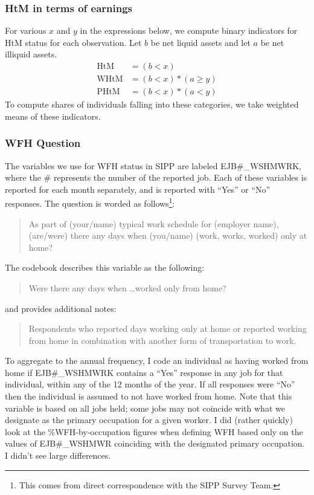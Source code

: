 \documentclass{article}
\begin{document}
\subsubsection{HtM in terms of earnings}
For various $x$ and $y$ in the expressions below, we compute binary indicators for HtM status for each observation. Let $b$ be net liquid assets and let $a$ be net illiquid assets.
\begin{align*}
\text{HtM} &= (b < x) \\
\text{WHtM} &= (b < x) * (a \geq y) \\
\text{PHtM} &= (b < x) * (a < y)
\end{align*}
To compute shares of individuals falling into these categories, we take weighted means of these indicators.

\subsubsection{WFH Question}
The variables we use for WFH status in SIPP are labeled EJB\#\_WSHMWRK,
where the \# represents the number of the reported job.
Each of these variables is reported for each month separately, and is reported with ``Yes'' or ``No'' responses.
The question is worded as follows\footnote{This comes from direct correspondence with the SIPP Survey Team.}:
\begin{quote}
As part of (your/name) typical work schedule for (employer name), (are/were) there any days when (you/name) (work, works, worked) only at home?
\end{quote}

\if The codebook describes this variable as the following:
\begin{quote}
Were there any days when \ldots worked only from home?
\end{quote}
and provides additional notes:
\begin{quote}
Respondents who reported days working only at home or reported working from home in combination with another form of transportation to work.
\end{quote}
\fi
To aggregate to the annual frequency, I code an individual as having worked from home if EJB\#\_WSHMWRK contains a ``Yes'' response in any job for that individual, within any of the 12 months of the year. If all responses were ``No'' then the individual is assumed to not have worked from home.
Note that this variable is based on all jobs held; some jobs may not coincide with what we designate as the primary occupation for a given worker. I did (rather quickly) look at the \%WFH-by-occupation figures when defining WFH based only on the values of EJB\#\_WSHMWR coinciding with the designated primary occupation. I didn't see large differences.
\end{document}
